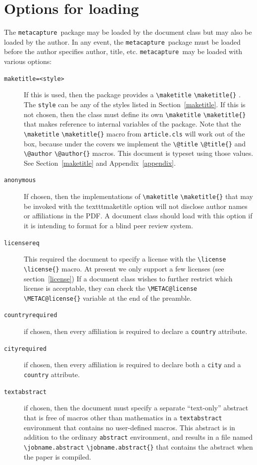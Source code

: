 \documentclass{article}
\newcommand{\pkgname}{\texttt{metacapture}}
\newcommand{\cmd}[2][]{%
  \def\FirstArg{#1}%
  \ifx\FirstArg\empty%
    \texttt{\textbackslash{}#2}%
  \else%
    \texttt{\textbackslash{}#2\{#1\}}%
  \fi
}
\begin{document}
\section{Options for loading}
The \pkgname\ package may be loaded by the document class but may also be loaded by the
author. In any event, the \pkgname\ package must be loaded before the author specifies
author, title, etc. \pkgname\  may be loaded with various options:
\begin{description}
\item[\texttt{maketitle=\textless{style}\textgreater}]
If this is used, then the package provides
a \cmd{maketitle}. The \texttt{style} can be any of the styles listed
in Section~\ref{maketitle}.  If this is not chosen, then the class
must define its own \cmd{maketitle} that makes reference to internal variables
of the package. Note that the \cmd{maketitle} macro from \texttt{article.cls} will
work out of the box, because under the covers we implement the \cmd{@title} and
\cmd{@author} macros. This document is typeset using those values. See Section~\ref{maketitle} and
Appendix~\ref{appendix}.
\item[\texttt{anonymous}] If chosen, then the implementations of \cmd{maketitle} that
may be invoked with the texttt{maketitle} option will not disclose
author names or affiliations in the PDF. A document class should load
with this option if it is intending to format for a blind peer review
system.
\item[\texttt{licensereq}] This required the document to specify
a license with the \cmd{license} macro.  At present we only support a
few licenses (see section~\ref{license}) If a document class wishes to
further restrict which license is acceptable, they can check
the \cmd{METAC@license} variable at the end of the preamble.
\item[\texttt{countryrequired}] if chosen, then every affiliation is
required to declare a \texttt{country} attribute.
\item[\texttt{cityrequired}] if chosen, then every affiliation is
required to declare both a \texttt{city} and a \texttt{country} attribute.
\item[\texttt{textabstract}] if chosen, then the document must specify a
separate ``text-only'' abstract that is free of macros other than
mathematics in a \texttt{textabstract}
environment that contains no user-defined macros. This abstract is in
addition to the ordinary \texttt{abstract} environment, and results in a file
named \cmd{jobname.abstract} that contains the abstract when the paper is compiled.

\end{description}
\end{document}
